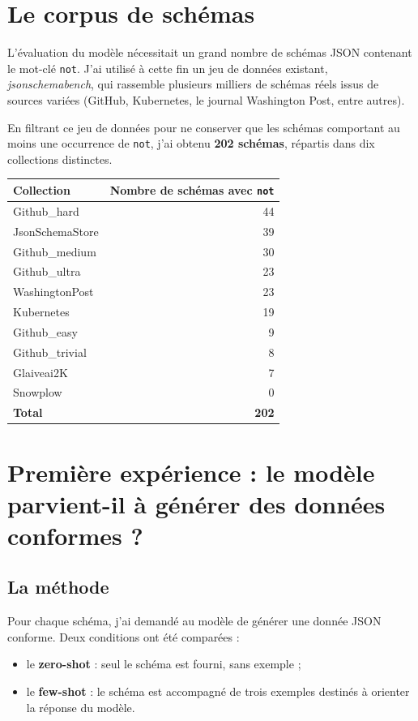 \documentclass[11pt,a4paper]{article}
\begin{document}
\section{Le corpus de schémas}

L'évaluation du modèle nécessitait un grand nombre de schémas JSON contenant le mot-clé \texttt{not}. J'ai utilisé à cette fin un jeu de données existant, \emph{jsonschemabench}, qui rassemble plusieurs milliers de schémas réels issus de sources variées (GitHub, Kubernetes, le journal Washington Post, entre autres).

En filtrant ce jeu de données pour ne conserver que les schémas comportant au moins une occurrence de \texttt{not}, j'ai obtenu \textbf{202 schémas}, répartis dans dix collections distinctes.

\begin{table}[H]
\centering
\begin{tabular}{lr}
\toprule
Collection & Nombre de schémas avec \texttt{not} \\
\midrule
Github\_hard & 44 \\
JsonSchemaStore & 39 \\
Github\_medium & 30 \\
Github\_ultra & 23 \\
WashingtonPost & 23 \\
Kubernetes & 19 \\
Github\_easy & 9 \\
Github\_trivial & 8 \\
Glaiveai2K & 7 \\
Snowplow & 0 \\
\midrule
\textbf{Total} & \textbf{202} \\
\bottomrule
\end{tabular}
\end{table}

\section{Première expérience : le modèle parvient-il à générer des données conformes ?}

\subsection{La méthode}

Pour chaque schéma, j'ai demandé au modèle de générer une donnée JSON conforme. Deux conditions ont été comparées :
\begin{itemize}
    \item le \textbf{zero-shot} : seul le schéma est fourni, sans exemple ;
    \item le \textbf{few-shot} : le schéma est accompagné de trois exemples destinés à orienter la réponse du modèle.
\end{itemize}
\end{document}
